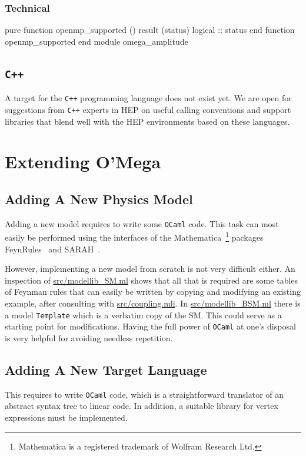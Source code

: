 \documentclass[12pt,a4paper]{article}
\newenvironment{code}{\verbatim}{\endverbatim\noindent}
\def\OCaml/{\texttt{OCaml}}
\begin{document}
\subsubsection{Technical}
\begin{code}
  pure function openmp_supported () result (status)
    logical :: status
  end function openmp_supported
\end{code}
\begin{code}
end module omega_amplitude
\end{code}
\subsection{\texttt{C++}}
A target for the \texttt{C++} programming language does not exist yet.
We are open for suggestions from \texttt{C++} experts in HEP on useful
calling conventions and support libraries that blend well with the
HEP environments based on these languages.

\section{Extending O'Mega}
\label{sec:extensions}
\subsection{Adding A New Physics Model}
Adding a new model requires to write some \OCaml/ code.  This task can
most easily be performed using the interfaces of the
Mathematica~\footnote{Mathematica is a registered trademark of Wolfram
  Research Ltd.} packages FeynRules~\cite{FeynRules} and
SARAH~\cite{SARAH}. 

However, implementing a new model from scratch is not very difficult
either.  An inspection of \url{src/modellib_SM.ml} shows that all that
is required are some tables of Feynman rules that can easily be
written by copying and modifying an existing example, after consulting
with \url{src/coupling.mli}. In \url{src/modellib_BSM.ml} there is a
model \verb+Template+ which is a verbatim copy of the SM. This could serve
as a starting point for modifications. Having the full power of \OCaml/ at one's
disposal is very helpful for avoiding needless repetition.

\subsection{Adding A New Target Language}
This requires to write \OCaml/ code, which is a straightforward
translator of an abstract syntax tree to linear code.  In addition, a
suitable library for vertex expressions must be implemented.

\end{document}
